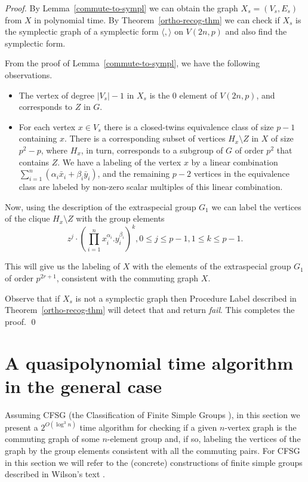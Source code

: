 \documentclass{elsarticle}
\newcommand{\sympl}[1]{\langle #1 \rangle}
\begin{document}
\begin{proof}
  By Lemma~\ref{commute-to-sympl} we can obtain the graph
  $X_s=(V_s,E_s)$ from $X$ in polynomial time. By
  Theorem~\ref{ortho-recog-thm} we can check if $X_s$ is the
  symplectic graph of a symplectic form $\sympl{,}$ on $V(2n,p)$
  and also find the symplectic form.

  From the proof of Lemma~\ref{commute-to-sympl}, we have the
  following observations.
\begin{itemize}
\item The vertex of degree $|V_s|-1$ in $X_s$ is the $0$ element of
  $V(2n,p)$, and corresponds to $Z$ in $G$.
\item For each vertex $x\in V_s$ there is a closed-twins equivalence
  class of size $p-1$ containing $x$. There is a corresponding subset
  of vertices $H_x\setminus Z$ in $X$ of size $p^2-p$, where $H_x$, in
  turn, corresponds to a subgroup of $G$ of order $p^2$ that contains
  $Z$. We have a labeling of the vertex $x$ by a linear combination
  $\sum_{i=1}^n( \alpha_i \bar{x}_i + \beta_i \bar{y}_i)$, and the remaining $p-2$
  vertices in the equivalence class are labeled by non-zero scalar
  multiples of this linear combination.
\end{itemize}

  Now, using the description of the extraspecial group $G_1$ we can
  label the vertices of the clique $H_x\setminus Z$ with the group
  elements
\[
  z^j\cdot \left(\prod_{i=1}^n x_i^{\alpha_i}.y_i^{\beta_i}\right)^k,
  0\le j\le p-1, 1\le k \le p-1.
\]

 This will give us the labeling of $X$ with the elements of the
 extraspecial group $G_1$ of order $p^{2r+1}$, consistent with the
 commuting graph $X$.

 Observe that if $X_s$ is not a symplectic graph then Procedure
 Label described in Theorem~\ref{ortho-recog-thm} will detect that and
 return \emph{fail}. This completes the proof. \qed
\end{proof}


\section{A quasipolynomial time algorithm in the general case}

Assuming CFSG (the Classification of Finite Simple Groups
\cite{CFSG}), in this section we present a $2^{O(\log^3 n)}$ time
algorithm for checking if a given $n$-vertex graph is the commuting
graph of some $n$-element group and, if so, labeling the vertices of
the graph by the group elements consistent with all the commuting
pairs. For CFSG in this section we will refer to the (concrete)
constructions of finite simple groups described in Wilson's text
\cite{Wilson-book}.
\end{document}
